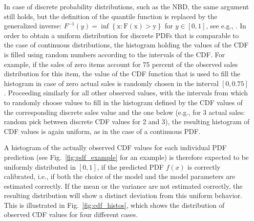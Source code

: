 \documentclass[BCOR=1mm, DIV=calc,10pt,
twoside=true,
twocolumn,
headings=normal]{scrartcl}
\newcommand{\fig}{Fig.~}
\begin{document}
In case of discrete probability distributions, such as the NBD, the same argument still holds, but the definition of the quantile function is replaced by the generalized inverse: $F^{-1}(y) = \mathrm{\inf \left \{x : F(x)>y\right  \} }$ for $y \in [0,1]$, see e.g., \cite[p. 54]{casella2002statistical}. In order to obtain a uniform distribution for discrete PDFs that is comparable to the case of continuous distributions, the histogram holding the values of the CDF is filled using random numbers according to the intervals of the CDF. For example, if the sales of zero items account for 75 percent of the observed sales distribution for this item, the value of the CDF function that is used to fill the histogram in case of zero actual sales is randomly chosen in the interval $[0, 0.75]$. Proceeding similarly for all other observed values, with the intervals from which to randomly choose values to fill in the histogram defined by the CDF values of the corresponding discrete sales value and the one below (e.g., for 3 actual sales: random pick between discrete CDF values for 2 and 3), the resulting histogram of CDF values is again uniform, as in the case of a continuous PDF.

A histogram of the actually observed CDF values for each individual PDF prediction (see \fig \ref{fig:pdf_example} for an example) is therefore expected to be uniformly distributed in $[0,1]$, if the predicted PDF $f(x)$ is correctly calibrated, i.e., if both the choice of the model and the model parameters are estimated correctly. If the mean or the variance are not estimated correctly, the resulting distribution will show a distinct deviation from this uniform behavior. This is illustrated in \fig \ref{fig:cdf_histos}, which shows the distribution of observed CDF values for four different cases.
\end{document}
